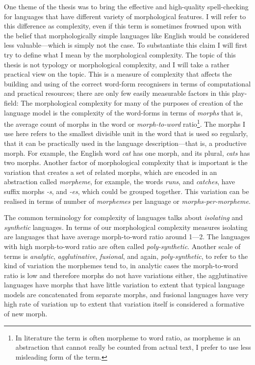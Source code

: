 \documentclass[officiallayout,draft]{unihelcompling}
\begin{document}
One theme of the thesis was to bring the effective and high-quality
spell-checking for languages that have different variety of morphological
features. I will refer to this difference as complexity, even if this term is
sometimes frowned upon with the belief that morphologically simple languages
like English would be considered less valuable---which is simply not the case.
To substantiate this claim I will first try to define what I mean by the
morphological complexity. The topic of this thesis is not typology or
morphological complexity, and I will take a rather practical view on the topic.
This is a measure of complexity that affects the building and using of the
correct word-form recognisers in terms of computational and practical
resources; there are only few easily measurable factors in this play-field: The
morphological complexity for many of the purposes of creation of the language
model is the complexity of the word-forms in terms of \emph{morphs} that is,
the average count of morphs in the word or \emph{morph-to-word}
ratio\footnote{In literature the term is often morpheme to word ratio, as
    morpheme is an abstraction that cannot really be counted from actual text,
I prefer to use less misleading form of the term.}. The morphs I use here
refers to the smallest divisible unit in the word that is used so regularly,
that it can be practically used in the language description---that is, a
productive morph. For example, the English word \emph{cat} has one morph, and
its plural, \emph{cats} has two morphs.  Another factor of morphological
complexity that is important is the variation that creates a set of related
morphs, which are encoded in an abstraction called \emph{morpheme}, for
example, the words \emph{runs}, and \emph{catches}, have suffix morphs
\emph{-s}, and \emph{-es}, which could be grouped together. This variation can
be realised in terms of number of \emph{morphemes} per language or
\emph{morphs-per-morpheme}.

The common terminology for complexity of languages talks about \emph{isolating}
and \emph{synthetic} languages. In terms of our morphological complexity
measures isolating are languages that have average morph-to-word ratio around
1---2. The languages with high morph-to-word ratio are often called
\emph{poly-synthetic}. Another scale of terms is \emph{analytic},
\emph{agglutinative}, \emph{fusional}, and again, \emph{poly-synthetic}, to
refer to the kind of variation the morphemes tend to, in analytic cases the
morph-to-word ratio is low and therefore morphs do not have variations either,
the agglutinative languages have morphs that have little variation to extent
that typical language models are concatenated from separate morphs, and
fusional languages have very high rate of variation up to extent that variation
itself is considered a formative of new morph. 
\end{document}
